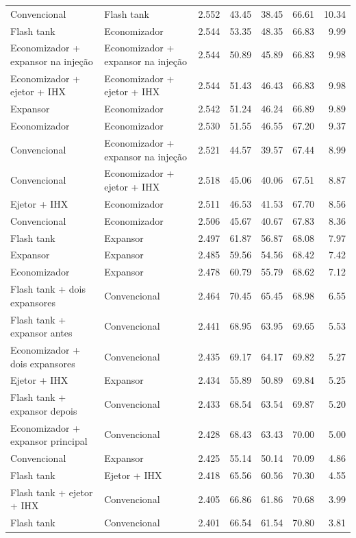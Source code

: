 {\begin{tabular}{llrrrrr}
Convencional & Flash tank & 2.552 & 43.45 & 38.45 & 66.61 & 10.34 \\
Flash tank & Economizador & 2.544 & 53.35 & 48.35 & 66.83 & 9.99 \\
Economizador + expansor na injeção & Economizador + expansor na injeção & 2.544 & 50.89 & 45.89 & 66.83 & 9.98 \\
Economizador + ejetor + IHX & Economizador + ejetor + IHX & 2.544 & 51.43 & 46.43 & 66.83 & 9.98 \\
Expansor & Economizador & 2.542 & 51.24 & 46.24 & 66.89 & 9.89 \\
Economizador & Economizador & 2.530 & 51.55 & 46.55 & 67.20 & 9.37 \\
Convencional & Economizador + expansor na injeção & 2.521 & 44.57 & 39.57 & 67.44 & 8.99 \\
Convencional & Economizador + ejetor + IHX & 2.518 & 45.06 & 40.06 & 67.51 & 8.87 \\
Ejetor + IHX & Economizador & 2.511 & 46.53 & 41.53 & 67.70 & 8.56 \\
Convencional & Economizador & 2.506 & 45.67 & 40.67 & 67.83 & 8.36 \\
Flash tank & Expansor & 2.497 & 61.87 & 56.87 & 68.08 & 7.97 \\
Expansor & Expansor & 2.485 & 59.56 & 54.56 & 68.42 & 7.42 \\
Economizador & Expansor & 2.478 & 60.79 & 55.79 & 68.62 & 7.12 \\
Flash tank + dois expansores & Convencional & 2.464 & 70.45 & 65.45 & 68.98 & 6.55 \\
Flash tank + expansor antes & Convencional & 2.441 & 68.95 & 63.95 & 69.65 & 5.53 \\
Economizador + dois expansores & Convencional & 2.435 & 69.17 & 64.17 & 69.82 & 5.27 \\
Ejetor + IHX & Expansor & 2.434 & 55.89 & 50.89 & 69.84 & 5.25 \\
Flash tank + expansor depois & Convencional & 2.433 & 68.54 & 63.54 & 69.87 & 5.20 \\
Economizador + expansor principal & Convencional & 2.428 & 68.43 & 63.43 & 70.00 & 5.00 \\
Convencional & Expansor & 2.425 & 55.14 & 50.14 & 70.09 & 4.86 \\
Flash tank & Ejetor + IHX & 2.418 & 65.56 & 60.56 & 70.30 & 4.55 \\
Flash tank + ejetor + IHX & Convencional & 2.405 & 66.86 & 61.86 & 70.68 & 3.99 \\
Flash tank & Convencional & 2.401 & 66.54 & 61.54 & 70.80 & 3.81 \\

\end{tabular}}
